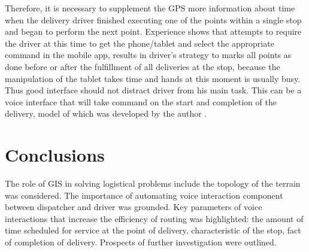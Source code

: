 Therefore, it is necessary to supplement the GPS more information about time when the delivery driver finished executing one of the points within a single stop and began to perform the next point. Experience shows that attempts to require the driver at this time to get the phone/tablet and select the appropriate command in the mobile app, results in driver’s strategy to marks all points as done before or after the fulfillment of all deliveries at the stop, because the manipulation of the tablet takes time and hands at this moment is usually busy. Thus good interface should not distract driver from his main task. This can be a voice interface that will take command on the start and completion of the delivery, model of which was developed by the author \cite{eng_art2}.

\section*{Conclusions}

The role of GIS in solving logistical problems include the topology of the terrain was considered. The importance of automating voice interaction component between dispatcher and driver was grounded. Key parameters of voice interactions that increase the efficiency of routing was highlighted: the amount of time scheduled for service at the point of delivery, characteristic of the stop, fact of completion of delivery. Prospects of further investigation were outlined.
